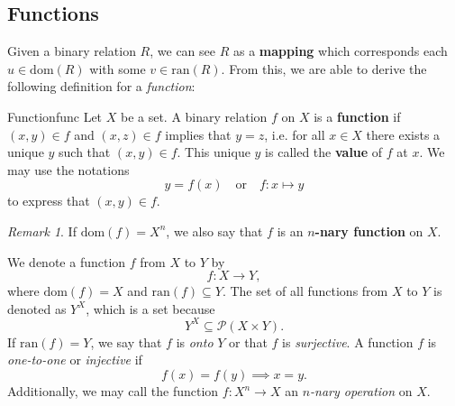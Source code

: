 \documentclass[math]{amznotes}
\theoremstyle{remark}
\newtheorem*{remark}{Remark}
\begin{document}
\subsection{Functions}
Given a binary relation $R$, we can see $R$ as a \textbf{mapping} which corresponds each $u \in \mathrm{dom}(R)$ with some $v \in \mathrm{ran}(R)$. From this, we are able to derive the following definition for a \textit{function}:
\begin{dfnbox}{Function}{func}
    Let $X$ be a set. A binary relation $f$ on $X$ is a {\color{red} \textbf{function}} if $(x, y) \in f$ and $(x, z) \in f$ implies that $y = z$, i.e. for all $x \in X$ there exists a unique $y$ such that $(x, y) \in f$. This unique $y$ is called the {\color{red} \textbf{value}} of $f$ at $x$. We may use the notations
    \begin{displaymath}
        y = f(x) \quad \textrm{or} \quad f \colon x \mapsto y
    \end{displaymath}
    to express that $(x, y) \in f$.
\end{dfnbox}
\begin{notebox}
    \begin{remark}
        If $\mathrm{dom}(f) = X^n$, we also say that $f$ is an {\color{red} \textbf{$n$-nary function}} on $X$.
    \end{remark}
\end{notebox}
We denote a function $f$ from $X$ to $Y$ by
\begin{displaymath}
    f \colon X \to Y,
\end{displaymath}
where $\mathrm{dom}(f) = X$ and $\mathrm{ran}(f) \subseteq Y$. The set of all functions from $X$ to $Y$ is denoted as $Y^X$, which is a set because
\begin{displaymath}
    Y^X \subseteq \mathcal{P}(X \times Y).
\end{displaymath}
If $\mathrm{ran}(f) = Y$, we say that $f$ is \textit{onto} $Y$ or that $f$ is \textit{surjective}. A function $f$ is \textit{one-to-one} or \textit{injective} if
\begin{displaymath}
    f(x) = f(y) \implies x = y.
\end{displaymath}
Additionally, we may call the function $f \colon X^n \to X$ an \textit{$n$-nary operation} on $X$.
\end{document}

